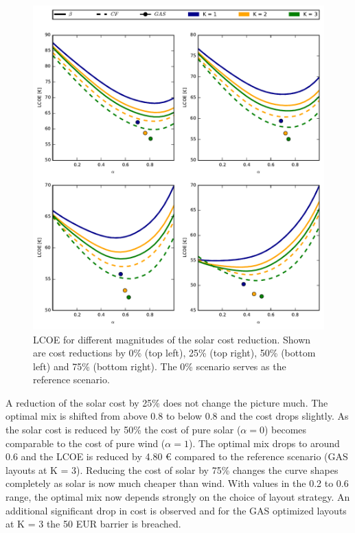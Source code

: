 \documentclass[a4paper, 5p, sort&compress]{elsarticle}%
\begin{document}
\begin{figure}[p]
  \centering
  \includegraphics[width = 2\columnwidth]{solarAnalysis}
  \caption{LCOE for different magnitudes of the solar cost
    reduction. Shown are cost reductions by 0\% (top left), 25\% (top
    right), 50\% (bottom left) and 75\% (bottom right). The 0\%
    scenario serves as the reference scenario.}
  \label{fig:red-solar}
\end{figure}

A reduction of the solar cost by 25\% does not change the picture
much. The optimal mix is shifted from above 0.8 to below 0.8 and the
cost drops slightly. As the solar cost is reduced by 50\% the cost of
pure solar ($\alpha=0$) becomes comparable to the cost of pure wind
($\alpha=1$). The optimal mix drops to around 0.6 and the LCOE is reduced
by 4.80 \euro{}
compared to the reference scenario (GAS layouts at K = 3). Reducing
the cost of solar by 75\% changes the curve shapes completely as solar
is now much cheaper than wind. With values in the 0.2 to 0.6 range,
the optimal mix now depends strongly on the choice of layout
strategy. An additional significant drop in cost is observed and for
the GAS optimized layouts at K = 3 the 50 EUR barrier is breached.
\end{document}
